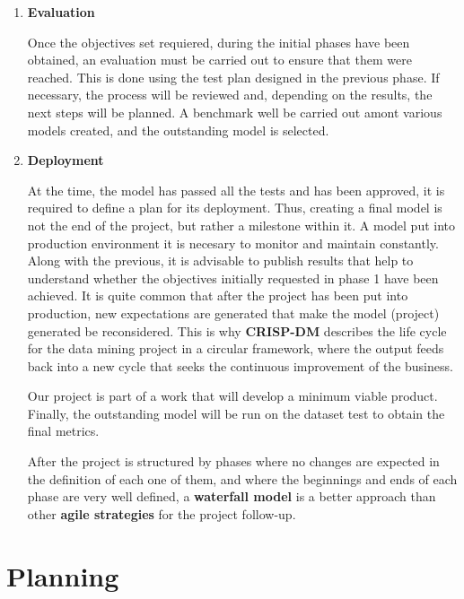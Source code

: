\begin{enumerate}
    
    \item \textbf{Evaluation}

    Once the objectives set requiered, during the initial phases have been obtained, an evaluation must be carried out to ensure that them were reached. This is done using the test plan designed in the previous phase. If necessary, the process will be reviewed and, depending on the results, the next steps will be planned. A benchmark well be carried out amont various models created, and the outstanding model is selected. 

    
    \item \textbf{Deployment}

    At the time, the model has passed all the tests and has been approved, it is required to define a plan for its deployment. Thus, creating a final model is not the end of the project, but rather a milestone within it. A model put into production environment it is necesary to monitor and maintain constantly. Along with the previous, it is advisable to publish results that help to understand whether the objectives initially requested in phase 1 have been achieved. It is quite common that after the project has been put into production, new expectations are generated that make the model (project) generated be reconsidered. This is why \textbf{CRISP-DM} describes the life cycle for the data mining project in a circular framework, where the output feeds back into a new cycle that seeks the continuous improvement of the business.

    Our project is part of a work that will develop a minimum viable product. Finally, the outstanding model will be run on the dataset test to obtain the final metrics.

After the project is structured by phases where no changes are expected in the definition of each one of them, and where the beginnings and ends of each phase are very well defined, a \textbf{waterfall model} is a better approach than other \textbf{agile strategies} for the project follow-up.

    
\end{enumerate}


\section{Planning}

